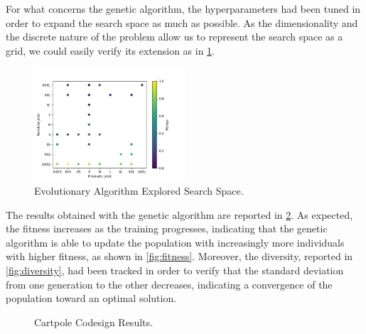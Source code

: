 For what concerns the genetic algorithm, the hyperparameters had been tuned in order to expand the search space as much as possible. As the dimensionality and the discrete nature of the problem allow us to represent the search space as a grid, we could easily verify its extension as in \cref{fig:searchspace}.

\begin{figure}
    \centering
    \caption{Evolutionary Algorithm Explored Search Space.}
    \label{fig:searchspace}
    \includegraphics[width=0.5\textwidth]{Images/search_space.png}
\end{figure}

The results obtained with the genetic algorithm are reported in \cref{fig:codesignresults}. As expected, the fitness increases as the training progresses, indicating that the genetic algorithm is able to update the population with increasingly more individuals with higher fitness, as shown in \cref{fig:fitness}. Moreover, the diversity, reported in \cref{fig:diversity}, had been tracked in order to verify that the standard deviation from one generation to the other decreases, indicating a convergence of the population toward an optimal solution.

\begin{figure}[h]
    \centering
    \caption{Cartpole Codesign Results.}
    \label{fig:codesignresults}
\end{figure}
